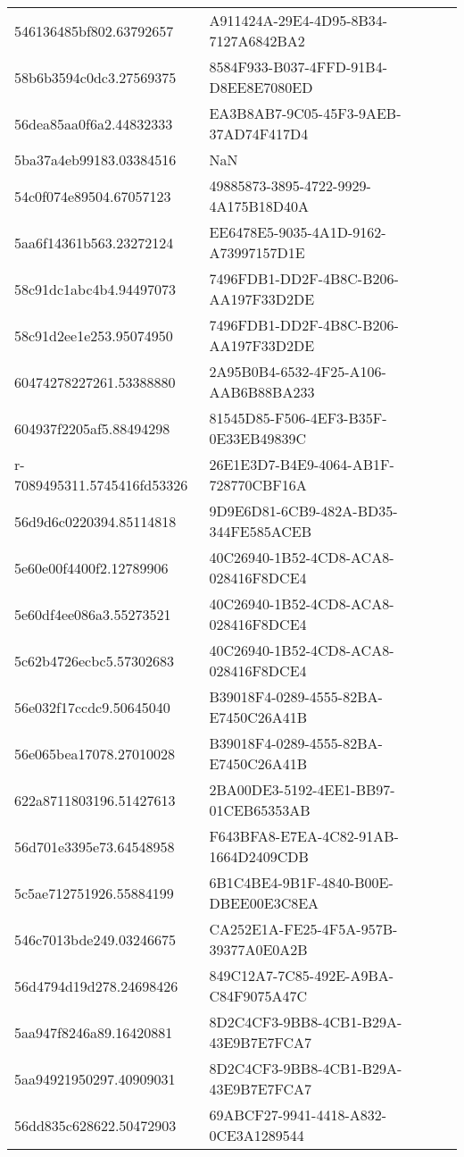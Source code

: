 \begin{tabular}{ll}
546136485bf802.63792657 & A911424A-29E4-4D95-8B34-7127A6842BA2 \\
58b6b3594c0dc3.27569375 & 8584F933-B037-4FFD-91B4-D8EE8E7080ED \\
56dea85aa0f6a2.44832333 & EA3B8AB7-9C05-45F3-9AEB-37AD74F417D4 \\
5ba37a4eb99183.03384516 & NaN \\
54c0f074e89504.67057123 & 49885873-3895-4722-9929-4A175B18D40A \\
5aa6f14361b563.23272124 & EE6478E5-9035-4A1D-9162-A73997157D1E \\
58c91dc1abc4b4.94497073 & 7496FDB1-DD2F-4B8C-B206-AA197F33D2DE \\
58c91d2ee1e253.95074950 & 7496FDB1-DD2F-4B8C-B206-AA197F33D2DE \\
60474278227261.53388880 & 2A95B0B4-6532-4F25-A106-AAB6B88BA233 \\
604937f2205af5.88494298 & 81545D85-F506-4EF3-B35F-0E33EB49839C \\
r-7089495311.5745416fd53326 & 26E1E3D7-B4E9-4064-AB1F-728770CBF16A \\
56d9d6c0220394.85114818 & 9D9E6D81-6CB9-482A-BD35-344FE585ACEB \\
5e60e00f4400f2.12789906 & 40C26940-1B52-4CD8-ACA8-028416F8DCE4 \\
5e60df4ee086a3.55273521 & 40C26940-1B52-4CD8-ACA8-028416F8DCE4 \\
5c62b4726ecbc5.57302683 & 40C26940-1B52-4CD8-ACA8-028416F8DCE4 \\
56e032f17ccdc9.50645040 & B39018F4-0289-4555-82BA-E7450C26A41B \\
56e065bea17078.27010028 & B39018F4-0289-4555-82BA-E7450C26A41B \\
622a8711803196.51427613 & 2BA00DE3-5192-4EE1-BB97-01CEB65353AB \\
56d701e3395e73.64548958 & F643BFA8-E7EA-4C82-91AB-1664D2409CDB \\
5c5ae712751926.55884199 & 6B1C4BE4-9B1F-4840-B00E-DBEE00E3C8EA \\
546c7013bde249.03246675 & CA252E1A-FE25-4F5A-957B-39377A0E0A2B \\
56d4794d19d278.24698426 & 849C12A7-7C85-492E-A9BA-C84F9075A47C \\
5aa947f8246a89.16420881 & 8D2C4CF3-9BB8-4CB1-B29A-43E9B7E7FCA7 \\
5aa94921950297.40909031 & 8D2C4CF3-9BB8-4CB1-B29A-43E9B7E7FCA7 \\
56dd835c628622.50472903 & 69ABCF27-9941-4418-A832-0CE3A1289544 \\

\end{tabular}

